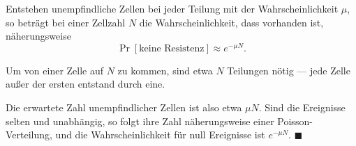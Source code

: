 \begin{merksatz}
Entstehen unempfindliche Zellen bei jeder Teilung mit der Wahrscheinlichkeit $\mu$, so beträgt bei einer Zellzahl $N$ die Wahrscheinlichkeit, dass  vorhanden ist, näherungsweise
\[ \Pr[\text{keine Resistenz}] \approx e^{-\mu N} . \]

Um von einer Zelle auf $N$ zu kommen, sind etwa $N$ Teilungen nötig --- jede Zelle außer der ersten entstand durch eine.

Die erwartete Zahl unempfindlicher Zellen ist also etwa $\mu N$. Sind die Ereignisse selten und unabhängig, so folgt ihre Zahl näherungsweise einer Poisson-Verteilung, und die Wahrscheinlichkeit für null Ereignisse ist $e^{-\mu N}$. $\blacksquare$

\begin{center}
\begin{minipage}{0.88\textwidth}
\end{minipage}
\end{center}
\end{merksatz}

